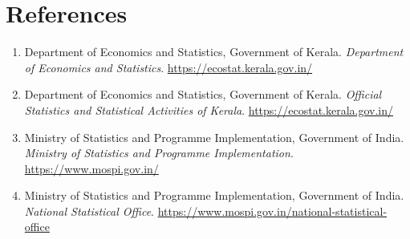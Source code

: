 \documentclass[12pt,a4paper]{article}
\begin{document}
\newpage

\section*{References}

\begin{enumerate}

    \item Department of Economics and Statistics, Government of Kerala. 
    \textit{Department of Economics and Statistics}. 
    \url{https://ecostat.kerala.gov.in/}

    \item Department of Economics and Statistics, Government of Kerala. 
    \textit{Official Statistics and Statistical Activities of Kerala}. 
    \url{https://ecostat.kerala.gov.in/}

    \item Ministry of Statistics and Programme Implementation, Government of India. 
    \textit{Ministry of Statistics and Programme Implementation}. 
    \url{https://www.mospi.gov.in/}

    \item Ministry of Statistics and Programme Implementation, Government of India. 
    \textit{National Statistical Office}. 
    \url{https://www.mospi.gov.in/national-statistical-office}

\end{enumerate}
\end{document}
